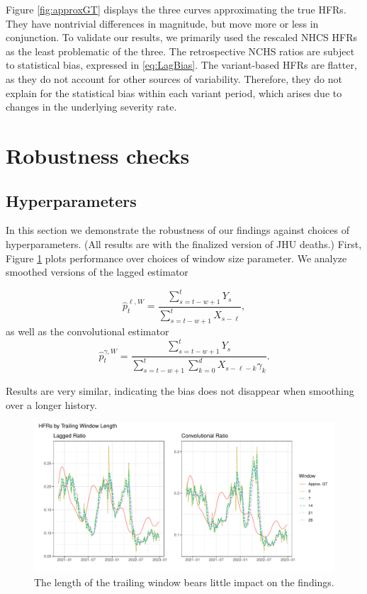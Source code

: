 \documentclass{article}
\begin{document}
Figure \ref{fig:approxGT} displays the three curves approximating the true HFRs. They have nontrivial differences in magnitude, but move more or less in conjunction. To validate our results, we primarily used the rescaled NHCS HFRs as the least problematic of the three. The retrospective NCHS ratios are subject to statistical bias, expressed in \eqref{eq:LagBias}. The variant-based HFRs are flatter, as they do not account for other sources of variability. Therefore, they do not explain for the statistical bias within each variant period, which arises due to changes in the underlying severity rate.  %

\section{Robustness checks}\label{apx:robustness}
\subsection{Hyperparameters}
In this section we demonstrate the robustness of our findings against choices of hyperparameters. (All results are with the finalized version of JHU deaths.) First, Figure \ref{fig:window} plots performance over choices of window size parameter. We analyze smoothed versions of the lagged estimator

\begin{equation}\label{eq:laggedSmooth}
    \hat{p}_t^{\ell, W} = \frac{\sum_{s=t-w+1}^{t} Y_s}{\sum_{s=t-w+1}^{t} X_{s-\ell}},
\end{equation}
\noindent as well as the convolutional estimator
\begin{equation}\label{eq:convSmooth}
    \hat{p}_t^{\gamma, W} = \frac{\sum_{s=t-w+1}^{t} Y_s}{\sum_{s=t-w+1}^{t} \sum_{k=0}^d X_{s-\ell-k}\gamma_k}.
\end{equation}

\noindent Results are very similar, indicating the bias does not disappear when smoothing over a longer history. 

\begin{figure}
    \centering
    \includegraphics[width=0.75\linewidth]{Figs/Real/window_size.pdf}
    \caption{The length of the trailing window bears little impact on the findings.}
    \label{fig:window}
\end{figure}
\end{document}
